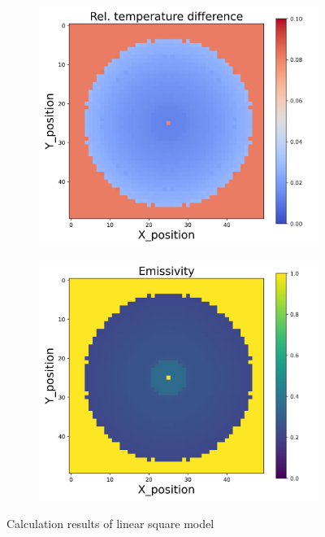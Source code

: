 \begin{figure}[htbp]
\begin{minipage}{\textwidth}
\begin{subfigure}{0.325\textwidth}
        \end{subfigure}
        \begin{subfigure}{0.325\textwidth}
            \centering
            \includegraphics[width=\textwidth]{figures/raw_data/5/lin_square/T_bias.jpg}
        \end{subfigure}
        \begin{subfigure}{0.325\textwidth}
            \centering
            \includegraphics[width=\textwidth]{figures/raw_data/5/lin_square/emi_cal.jpg}
        \end{subfigure}
    \end{minipage}
    \caption{Calculation results of linear square model}
    \label{fig: result_linear_square_model}
\end{figure}


